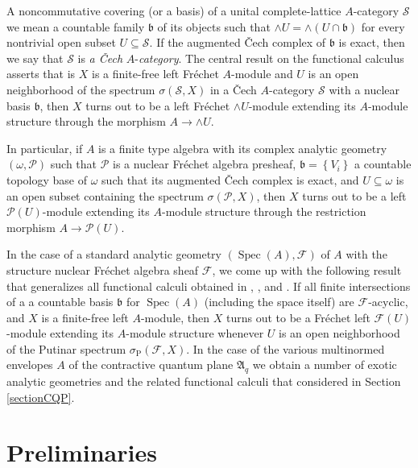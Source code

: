 \documentclass[12pt]{amsart}%
\theoremstyle{plain}
\numberwithin{equation}{section}
\numberwithin{equation}{section}
\numberwithin{theorem}{section}
\numberwithin{lemma}{section}
\numberwithin{remark}{section}
\numberwithin{example}{section}
\numberwithin{proposition}{section}
\numberwithin{definition}{section}
\numberwithin{corollary}{section}
\begin{document}
A noncommutative covering (or a basis) of a unital complete-lattice
$A$-category $\mathcal{S}$ we mean a countable family $\mathfrak{b}$ of its
objects such that $\wedge U=\wedge\left(  U\cap\mathfrak{b}\right)  $ for
every nontrivial open subset $U\subseteq\mathcal{S}$. If the augmented
\v{C}ech complex of $\mathfrak{b}$ is exact, then we say that $\mathcal{S}$ is
\textit{a \v{C}ech }$A$-\textit{category}. The central result on the
functional calculus asserts that is $X$ is a finite-free left Fr\'{e}chet
$A$-module and $U$ is an open neighborhood of the spectrum $\sigma\left(
\mathcal{S},X\right)  $ in a \v{C}ech $A$-category $\mathcal{S}$ with a
nuclear basis $\mathfrak{b}$, then $X$ turns out to be a left Fr\'{e}chet
$\wedge U$-module extending its $A$-module structure through the morphism
$A\rightarrow\wedge U$.

In particular, if $A$ is a finite type algebra with its complex analytic
geometry $\left(  \omega,\mathcal{P}\right)  $ such that $\mathcal{P}$ is a
nuclear Fr\'{e}chet algebra presheaf, $\mathfrak{b}=\left\{  V_{i}\right\}  $
a countable topology base of $\omega$ such that its augmented \v{C}ech complex
is exact, and $U\subseteq\omega$ is an open subset containing the spectrum
$\sigma\left(  \mathcal{P},X\right)  $, then $X$ turns out to be a left
$\mathcal{P}\left(  U\right)  $-module extending its $A$-module structure
through the restriction morphism $A\rightarrow\mathcal{P}\left(  U\right)  $.

In the case of a standard analytic geometry $\left(  \operatorname{Spec}%
\left(  A\right)  ,\mathcal{F}\right)  $ of $A$ with the structure nuclear
Fr\'{e}chet algebra sheaf $\mathcal{F}$, we come up with the following result
that generalizes all functional calculi obtained in \cite{Tay2}, \cite{Put},
\cite{Dos} and \cite{DosJOT10}. If all finite intersections of a a countable
basis $\mathfrak{b}$ for $\operatorname{Spec}\left(  A\right)  $ (including
the space itself) are $\mathcal{F}$-acyclic, and $X$ is a finite-free left
$A$-module, then $X$ turns out to be a Fr\'{e}chet left $\mathcal{F}\left(
U\right)  $-module extending its $A$-module structure whenever $U$ is an open
neighborhood of the Putinar spectrum $\sigma_{\operatorname{P}}\left(
\mathcal{F},X\right)  $. In the case of the various multinormed envelopes $A$
of the contractive quantum plane $\mathfrak{A}_{q}$ we obtain a number of
exotic analytic geometries and the related functional calculi that considered
in Section \ref{sectionCQP}.

\section{Preliminaries\label{sPre}}
\end{document}
